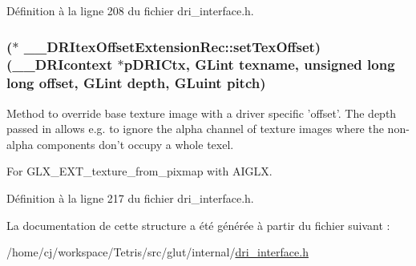 Définition à la ligne 208 du fichier dri\-\_\-interface.\-h.

\hypertarget{struct_____d_r_itex_offset_extension_rec_a889d52a2d3520b99644315fe8e947076}{
\subsubsection[{set\-Tex\-Offset}]{($\ast$ \-\_\-\-\_\-\-D\-R\-Itex\-Offset\-Extension\-Rec\-::set\-Tex\-Offset)({\bf \-\_\-\-\_\-\-D\-R\-Icontext} $\ast$p\-D\-R\-I\-Ctx, {\bf G\-Lint} texname, unsigned long long {\bf offset}, {\bf G\-Lint} {\bf depth}, {\bf G\-Luint} pitch)}}\label{struct_____d_r_itex_offset_extension_rec_a889d52a2d3520b99644315fe8e947076}
Method to override base texture image with a driver specific 'offset'. The depth passed in allows e.\-g. to ignore the alpha channel of texture images where the non-\/alpha components don't occupy a whole texel.

For G\-L\-X\-\_\-\-E\-X\-T\-\_\-texture\-\_\-from\-\_\-pixmap with A\-I\-G\-L\-X. 

Définition à la ligne 217 du fichier dri\-\_\-interface.\-h.



La documentation de cette structure a été générée à partir du fichier suivant \-:\begin{DoxyCompactItemize}
\item 
/home/cj/workspace/\-Tetris/src/glut/internal/\hyperlink{dri__interface_8h}{dri\-\_\-interface.\-h}\end{DoxyCompactItemize}
